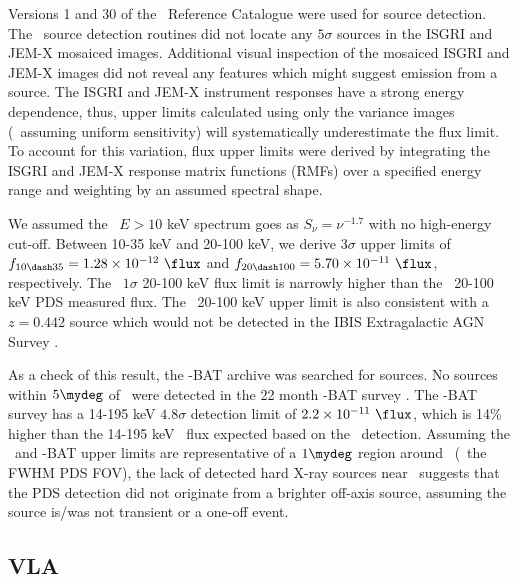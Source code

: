 \documentclass[useAMS,usenatbib]{mn2e}
\begin{document}
Versions 1 and 30 of the \integral\ Reference Catalogue were used for
source detection. The \osa\ source detection routines did not locate
any $5\sigma$ sources in the ISGRI and JEM-X mosaiced
images. Additional visual inspection of the mosaiced ISGRI and JEM-X
images did not reveal any features which might suggest emission from a
source. The ISGRI and JEM-X instrument responses have a strong energy
dependence, thus, upper limits calculated using only the variance
images (\ie\ assuming uniform sensitivity) will systematically
underestimate the flux limit. To account for this variation, flux
upper limits were derived by integrating the ISGRI and JEM-X response
matrix functions (RMFs) over a specified energy range and weighting by
an assumed spectral shape.

We assumed the \irs\ $E> 10$ keV spectrum goes as $S_{\nu} =
\nu^{-1.7}$ with no high-energy cut-off. Between 10-35 keV and 20-100
keV, we derive $3\sigma$ upper limits of $f_{10 \dash 35} = 1.28
\times 10^{-12} ~\flux$ and $f_{20 \dash 100} = 5.70 \times 10^{-11}
~\flux$, respectively. The \integral\ $1\sigma$ 20-100 keV flux limit
is narrowly higher than the \bepposax\ 20-100 keV PDS measured
flux. The \integral\ 20-100 keV upper limit is also consistent with a
$z = 0.442$ source which would not be detected in the IBIS
Extragalactic AGN Survey \citep{2006ApJ...636L..65B}.

As a check of this result, the \swift-BAT archive was searched for
sources. No sources within $5\mydeg$ of \irs\ were detected in the 22
month \swift-BAT survey \citep{2010ApJS..186..378T}. The \swift-BAT
survey has a 14-195 keV $4.8\sigma$ detection limit of $2.2 \times
10^{-11} ~\flux$, which is 14\% higher than the 14-195 keV \irs\ flux
expected based on the \bepposax\ detection. Assuming the
\integral\ and \swift-BAT upper limits are representative of a
$1\mydeg$ region around \irs\ (\ie\ the FWHM PDS FOV), the lack of
detected hard X-ray sources near \irs\ suggests that the PDS detection
did not originate from a brighter off-axis source, assuming the source
is/was not transient or a one-off event.

\subsection{VLA}
\label{sec:vla}
\end{document}
